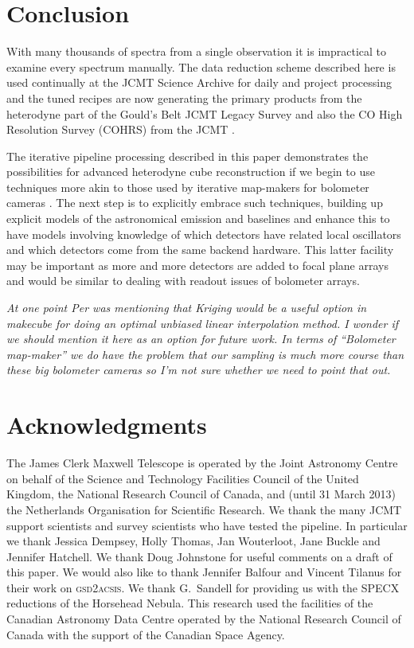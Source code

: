 \documentclass[final,authoryear,5p,times,twocolumn]{elsarticle}
\begin{document}
\section{Conclusion}

With many thousands of spectra from a single observation it is
impractical to examine every spectrum manually. The data reduction
scheme described here is used continually at the JCMT Science Archive
\citep{2011ASPC..442..203E} for daily and project processing and the
tuned recipes are now generating the primary products from the
heterodyne part of the Gould's Belt JCMT Legacy Survey
\citep{2007PASP..119..855W} and also the CO High Resolution Survey
(COHRS) from the JCMT \citep{2013ApJS..209....8D}.

The iterative pipeline processing described in this paper demonstrates
the possibilities for advanced heterodyne cube reconstruction if we
begin to use techniques more akin to those used by iterative
map-makers for bolometer cameras
\citep[e.g.][]{2013MNRAS.430.2545C}. The next step is to explicitly
embrace such techniques, building up explicit models of the
astronomical emission and baselines and enhance this to have models
involving knowledge of which detectors have related local oscillators
and which detectors come from the same backend hardware. This latter
facility may be important as more and more detectors are added to
focal plane arrays and would be similar to dealing with readout issues
of bolometer arrays.

\textit{\color{red} At one point Per was mentioning that Kriging would be a useful
  option in makecube for doing an optimal unbiased linear
  interpolation method. I wonder if we should mention it here as an
  option for future work. In terms of ``Bolometer map-maker'' we do
  have the problem that our sampling is much more course than these
  big bolometer cameras so I'm not sure whether we need to point that
  out.}

\section{Acknowledgments}

The James Clerk Maxwell Telescope is operated by the Joint Astronomy
Centre on behalf of the Science and Technology Facilities Council of
the United Kingdom, the National Research Council of Canada, and
(until 31 March 2013) the Netherlands Organisation for Scientific
Research. We thank the many JCMT support scientists and survey
scientists who have tested the pipeline. In particular we thank
Jessica Dempsey, Holly Thomas, Jan Wouterloot, Jane Buckle and
Jennifer Hatchell. We thank Doug Johnstone for useful comments on a
draft of this paper. We would also like to thank Jennifer Balfour and
Vincent Tilanus for their work on \textsc{gsd2acsis}. We thank
G.~Sandell for providing us with the SPECX reductions of the Horsehead
Nebula. This research used the facilities of the Canadian Astronomy
Data Centre operated by the National Research Council of Canada with
the support of the Canadian Space Agency.
\end{document}
